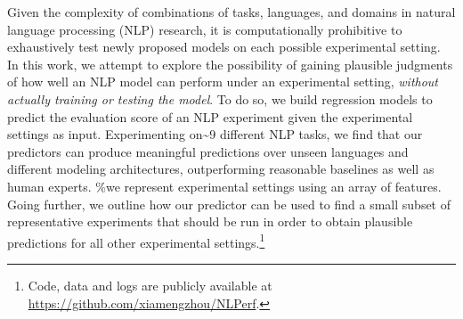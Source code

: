 Given the complexity of combinations of tasks, languages, and domains in natural language processing (NLP) research, it is computationally prohibitive to exhaustively test newly proposed models on each possible experimental setting. In this work, we attempt to explore the possibility of gaining plausible judgments of how well an NLP model can perform under an experimental setting, \textit{without actually training or testing the model}. To do so, we build regression models to predict the evaluation score of an NLP experiment given the experimental settings as input. Experimenting on{\textasciitilde}9 different NLP tasks, we find that our predictors can produce meaningful predictions over unseen languages and different modeling architectures, outperforming reasonable baselines as well as human experts. \%we represent experimental settings using an array of features. Going further, we outline how our predictor can be used to find a small subset of representative experiments that should be run in order to obtain plausible predictions for all other experimental settings.\footnote{Code, data and logs are publicly available at \url{https://github.com/xiamengzhou/NLPerf}.}
